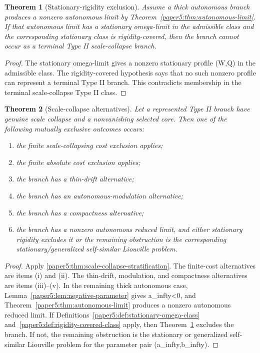\documentclass[11pt]{amsart}
\def\({}%
\def\){}%
\def\infty{infty}%
\theoremstyle{plain}
\newtheorem{theorem}{Theorem}[section]
\theoremstyle{definition}
\theoremstyle{remark}
\begin{document}
\begin{theorem}[Stationary-rigidity exclusion]\label{paper5:thm:stationary-rigidity-blocker}
Assume a thick autonomous branch produces a nonzero autonomous limit by
Theorem~\ref{paper5:thm:autonomous-limit}.  If that autonomous limit has a stationary omega-limit in
the admissible class and the corresponding stationary class is rigidity-covered, then the branch
cannot occur as a terminal Type II scale-collapse branch.
\end{theorem}

\begin{proof}
The stationary omega-limit gives a nonzero stationary profile \((W,Q)\) in the admissible class.
The rigidity-covered hypothesis says that no such nonzero profile can represent a terminal Type
II branch.  This contradicts membership in the terminal scale-collapse Type II class.
\end{proof}

\begin{theorem}[Scale-collapse alternatives]\label{paper5:thm:scale-collapse-alternatives}
Let a represented Type II branch have genuine scale collapse and a nonvanishing selected core.
Then one of the following mutually exclusive outcomes occurs:
\begin{enumerate}[label=(\roman*)]
  \item the finite scale-collapsing cost exclusion applies;
  \item the finite absolute cost exclusion applies;
  \item the branch has a thin-drift alternative;
  \item the branch has an autonomous-modulation alternative;
  \item the branch has a compactness alternative;
  \item the branch has a nonzero autonomous reduced limit, and either stationary rigidity
  excludes it or the remaining obstruction is the corresponding stationary/generalized
  self-similar Liouville problem.
\end{enumerate}
\end{theorem}

\begin{proof}
Apply \cref{paper5:thm:scale-collapse-stratification}.  The finite-cost alternatives are
items (i) and (ii).  The thin-drift, modulation, and compactness alternatives are items (iii)--(v).  In the
remaining thick autonomous case, Lemma~\ref{paper5:lem:negative-parameter} gives \(a_\infty<0\), and
Theorem~\ref{paper5:thm:autonomous-limit} produces a nonzero autonomous reduced limit.  If
Definitions~\ref{paper5:def:stationary-omega-class} and~\ref{paper5:def:rigidity-covered-class} apply, then
Theorem~\ref{paper5:thm:stationary-rigidity-blocker} excludes the branch.  If not, the remaining
obstruction is the stationary or generalized self-similar Liouville problem for the
parameter pair \((a_\infty,b_\infty)\).
\end{proof}
\end{document}
